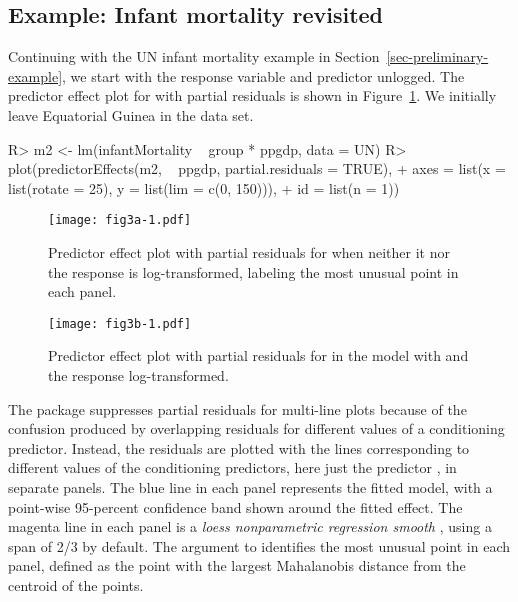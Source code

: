 \documentclass[article]{jss}
\begin{document}
\subsection{Example: Infant mortality revisited}\label{sec-infant-mortality-residuals}

Continuing with the UN infant mortality example in
Section~\ref{sec-preliminary-example}, we start with the response
variable  and predictor  unlogged.
The predictor effect plot for  with partial residuals is
shown in Figure~\ref{fig3a}. We initially leave Equatorial Guinea in
the data set.
%
\begin{Schunk}
\begin{Sinput}
R> m2 <- lm(infantMortality ~ group * ppgdp, data = UN)
R> plot(predictorEffects(m2, ~ ppgdp, partial.residuals = TRUE),
+    axes = list(x = list(rotate = 25), y = list(lim = c(0, 150))),
+    id = list(n = 1))
\end{Sinput}
\end{Schunk}
%
\begin{figure}[t!]
  \centerline{\texttt{[image: fig3a-1.pdf]}}
  \caption{Predictor effect plot with partial residuals for
     when neither it nor the response
     is log-transformed, labeling the most
    unusual point in each panel.\label{fig3a}}
\end{figure}

\begin{figure}[t!]
\centerline{\texttt{[image: fig3b-1.pdf]}}
\caption{Predictor effect plot with partial residuals for  in the model with  and the response  log-transformed.\label{fig3b}}
\end{figure}

The  package suppresses partial residuals for multi-line plots because of the confusion produced by overlapping residuals for different values of a conditioning predictor.  Instead, the residuals are plotted with the lines corresponding to different values of the conditioning predictors, here just the predictor , in separate panels. The blue line in each panel represents the fitted model, with a point-wise 95-percent confidence band shown around the fitted effect. The magenta line in each panel is a \emph{loess nonparametric regression smooth} \citep{ClevelandGrosseShyu92}, using a span of 2/3 by default. The argument  to  identifies the most unusual point in each panel, defined as the point with the largest Mahalanobis distance from the centroid of the points.
\end{document}
